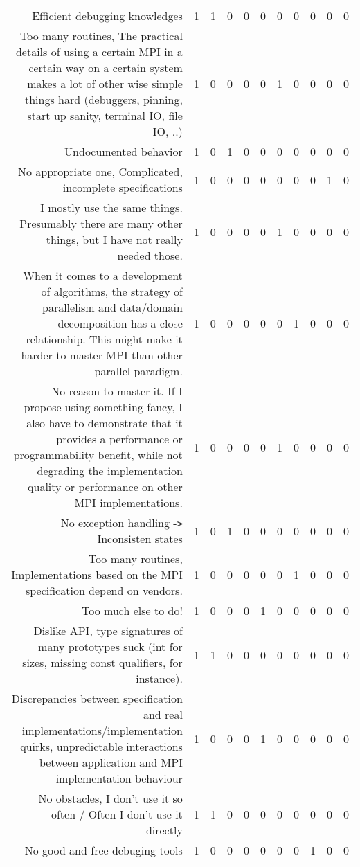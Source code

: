 {\begin{landscape}
\begin{longtable}[htb]{r|c|c|c|c|c|c|c|c|c|c}
{Efficient debugging knowledges} & 1 & 1 & 0 & 0 & 0 & 0 & 0 & 0 & 0 & 0 \\%
{Too many routines, The practical details of using a certain MPI in a certain way on a certain system makes a lot of other wise simple things hard (debuggers, pinning, start up sanity, terminal IO, file IO, ..)} & 1 & 0 & 0 & 0 & 0 & 1 & 0 & 0 & 0 & 0 \\%
{Undocumented behavior} & 1 & 0 & 1 & 0 & 0 & 0 & 0 & 0 & 0 & 0 \\%
{No appropriate one, Complicated, incomplete specifications} & 1 & 0 & 0 & 0 & 0 & 0 & 0 & 0 & 1 & 0 \\%
{I mostly use the same things.  Presumably there are many other things, but I have not really needed those.} & 1 & 0 & 0 & 0 & 0 & 1 & 0 & 0 & 0 & 0 \\%
{When it comes to a development of algorithms, the strategy of parallelism and  data/domain decomposition has a close relationship. This might make it harder to master MPI than other parallel paradigm.} & 1 & 0 & 0 & 0 & 0 & 0 & 1 & 0 & 0 & 0 \\%
{No reason to master it. If I propose using something fancy, I also have to demonstrate that it provides a performance or programmability benefit, while not degrading the implementation quality or performance on other MPI implementations.} & 1 & 0 & 0 & 0 & 0 & 1 & 0 & 0 & 0 & 0 \\%
{No exception handling -\verb!>! Inconsisten states} & 1 & 0 & 1 & 0 & 0 & 0 & 0 & 0 & 0 & 0 \\%
{Too many routines, Implementations based on the MPI specification depend on vendors.} & 1 & 0 & 0 & 0 & 0 & 0 & 1 & 0 & 0 & 0 \\%
{Too much else to do!} & 1 & 0 & 0 & 0 & 1 & 0 & 0 & 0 & 0 & 0 \\%
{Dislike API, type signatures of many prototypes suck (int for sizes, missing const qualifiers, for instance).} & 1 & 1 & 0 & 0 & 0 & 0 & 0 & 0 & 0 & 0 \\%
{Discrepancies between specification and real implementations/implementation quirks, unpredictable interactions between application and MPI implementation behaviour} & 1 & 0 & 0 & 0 & 1 & 0 & 0 & 0 & 0 & 0 \\%
{No obstacles, I don't use it so often / Often I don't use it directly} & 1 & 1 & 0 & 0 & 0 & 0 & 0 & 0 & 0 & 0 \\%
{No good and free debuging tools} & 1 & 0 & 0 & 0 & 0 & 0 & 0 & 1 & 0 & 0 \\%

\end{longtable}
\end{landscape}}
